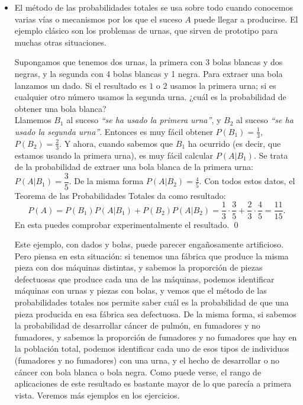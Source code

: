 \begin{itemize}
        \item El método de las probabilidades totales se usa sobre todo cuando conocemos varias vías o mecanismos por los que el suceso $A$ puede llegar a producirse. El ejemplo clásico son los {\sf problemas de urnas}, que sirven de prototipo para muchas otras situaciones.
            \begin{Ejemplo}\label{Sesion08:ejem:ProbailidadTotalEjemploUrnas}
                Supongamos que tenemos dos urnas, la primera con 3 bolas blancas y dos negras, y la segunda con 4 bolas blancas y 1 negra. Para extraer una bola lanzamos un dado. Si el resultado es $1$ o $2$ usamos la primera urna; si es cualquier otro número usamos la segunda urna. ¿cuál es la probabilidad de obtener una bola blanca?\\
                Llamemos $B_1$ al suceso {\em ``se ha usado la primera urna''}, y $B_2$ al suceso {\em ``se ha usado la segunda urna''}. Entonces es muy fácil obtener $P(B_1)=\frac{1}{3}$, $P(B_2)=\frac{2}{3}$. Y ahora, cuando sabemos que $B_1$ ha ocurrido (es decir, que estamos usando la primera urna), es muy fácil calcular $P(A|B_1)$.  Se trata de la probabilidad de extraer una bola blanca de la primera urna: $P(A|B_1)=\dfrac{3}{5}.$ De la misma forma $P(A|B_2)=\frac{4}{5}$. Con todos estos datos, el Teorema de las Probabilidades Totales da como resultado:
                \[P(A)=P(B_1)P(A|B_1)+P(B_2)P(A|B_2)=\dfrac{1}{3}\cdot\dfrac{3}{5}+\dfrac{2}{3}\cdot\dfrac{4}{5}=\dfrac{11}{15}.\]
                En esta  puedes comprobar experimentalmente el resultado. \qed
            \end{Ejemplo}
            Este ejemplo, con dados y bolas, puede parecer engañosamente artificioso. Pero piensa en esta situación: si tenemos una fábrica que produce la misma pieza con dos máquinas distintas, y sabemos la proporción de piezas defectuosas que produce cada una de las máquinas, podemos identificar máquinas con urnas y piezas con bolas, y vemos que el método de las probabilidades totales nos permite saber cuál es la probabilidad de que una pieza producida en esa fábrica sea defectuosa. De la misma forma, si sabemos la probabilidad de desarrollar cáncer de pulmón, en  fumadores y no fumadores, y sabemos la proporción de fumadores y no fumadores que hay en la población total, podemos identificar cada uno de esos tipos de individuos (fumadores y no fumadores) con una urna, y el hecho de desarrollar o no cáncer con bola blanca o bola negra. Como puede verse, el rango de aplicaciones de este resultado es bastante mayor de lo que parecía a primera vista. Veremos más ejemplos en los ejercicios.


\end{itemize}

